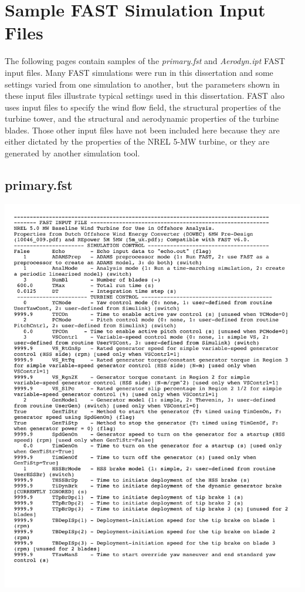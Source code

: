 
\chapter{Sample FAST Simulation Input Files} %

\label{AppendixA} %

The following pages contain samples of the \textit{primary.fst} and \textit{Aerodyn.ipt} FAST input files. Many FAST simulations were run in this dissertation and some settings varied from one simulation to another, but the parameters shown in these input files illustrate typical settings used in this dissertation. FAST also uses input files to specify the wind flow field, the structural properties of the turbine tower,  and the structural and aerodynamic properties of the turbine blades. Those other input files have not been included here because they are either dictated by the properties of the NREL 5-MW turbine, or they are generated by another simulation tool.

\pagebreak
\section{primary.fst} \label{sectionA-1}

\noindent
\includegraphics[width=\linewidth]{Figures/AppendixAFigures/primaryP1.pdf}		


